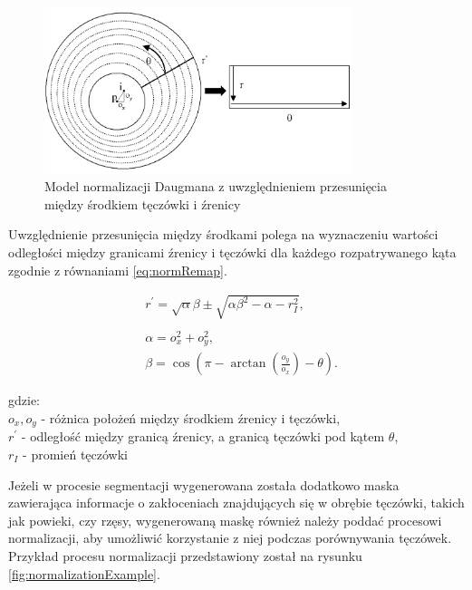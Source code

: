 \begin{figure}[ht]
  \includegraphics[width=0.8\textwidth]{images/normalization/schemaOffCenter.png}
  \centering
  \caption{Model normalizacji Daugmana z uwzględnieniem przesunięcia między środkiem tęczówki i \'zrenicy \cite{aliasingIris}}
  \label{fig:daugmanDiagramOffCenter}
\end{figure}

Uwzględnienie przesunięcia między środkami polega na wyznaczeniu wartości odległości między granicami
\'zrenicy i tęczówki dla każdego rozpatrywanego kąta \cite{masek} zgodnie z równaniami \ref{eq:normRemap}.

\begin{equation}
  \begin{aligned}
    &r^{\prime} = \sqrt{\alpha}\beta \pm \sqrt{\alpha\beta^{2} - \alpha - r_{I}^{2}},
    \\
    \\
    &\alpha = o_{x}^{2} + o_{y}^{2},
    \\
    &\beta = \cos \left( \pi - \arctan \left( \frac{o_{y}}{o_{x}} \right) - \theta \right).
  \end{aligned}
  \label{eq:normRemap}
\end{equation}

\noindent
gdzie:\\
\indent $o_{x}, o_{y}$ - różnica położeń między środkiem \'zrenicy i tęczówki,\\
\indent $r^{\prime}$ - odległoś\'c między granicą \'zrenicy, a granicą tęczówki pod kątem $\theta$,\\
\indent $r_{I}$ - promień tęczówki\newline

Jeżeli w procesie segmentacji wygenerowana została dodatkowo maska zawierająca informacje o
zakłoceniach znajdujących się w obrębie tęczówki, takich jak powieki, czy rzęsy, wygenerowaną
maskę również należy podda\'c procesowi normalizacji, aby umożliwi\'c korzystanie z niej podczas
porównywania tęczówek. Przykład procesu normalizacji przedstawiony został na rysunku \ref{fig:normalizationExample}.

